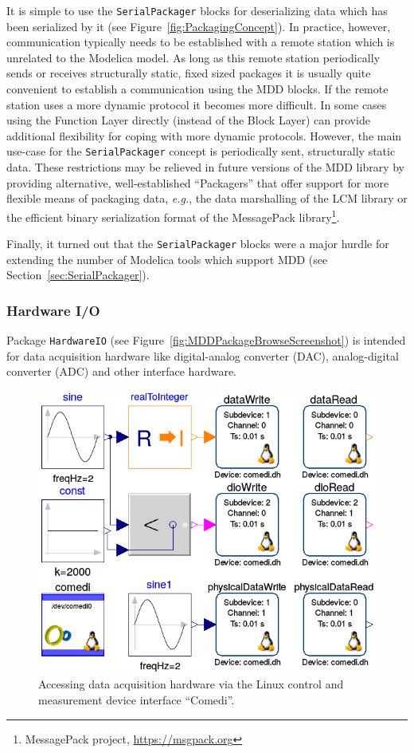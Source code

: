 \documentclass{resources/modelica}
\newcommand{\modelica}[1]{\lstinline[language=modelica]|#1|}
\begin{document}
It is simple to use the
\modelica{SerialPackager} blocks for deserializing data which has been serialized by it
(see Figure~\ref{fig:PackagingConcept}). In practice, however, communication
typically needs to be established with a remote station which is unrelated to
the Modelica model. As long as this remote station periodically sends or
receives structurally static, fixed sized packages it is usually quite
convenient to establish a communication using the MDD blocks. If the remote
station uses a more dynamic protocol it becomes more difficult. In some cases
using the \textsf{Function Layer} directly (instead of the \textsf{Block Layer})
can provide additional flexibility for coping with more dynamic protocols.
However, the main use-case for the \modelica{SerialPackager} concept is periodically
sent, structurally static data. These restrictions may be relieved in
future versions of the MDD library by providing alternative, well-established ``Packagers'' that offer support for more
flexible means of packaging data, \textit{e.g.}, the data marshalling of the LCM library or
the efficient binary serialization format of the MessagePack library\footnote{MessagePack project,
\url{https://msgpack.org}}.

Finally, it turned out that the \modelica{SerialPackager} blocks were a major hurdle for
extending the number of Modelica tools which support MDD (see Section~\ref{sec:SerialPackager}).

\subsubsection{Hardware I/O}

Package \modelica{HardwareIO} (see
Figure~\ref{fig:MDDPackageBrowseScreenshot}) is intended for data acquisition
hardware like digital-analog converter (DAC), analog-digital converter (ADC) and
other interface hardware.

\begin{figure}[h]
  \centering
  \includegraphics[width=0.9\columnwidth]{figures/MDDComedi}
  \caption{Accessing data acquisition hardware via the Linux
  control and measurement device interface ``Comedi''.}
  \label{fig:MDDComedi}
\end{figure}
\end{document}
